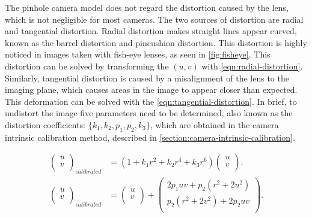 The pinhole camera model does not regard the distortion caused by the lens, which is not negligible for most cameras. The two sources of distortion are radial and tangential distortion. Radial distortion makes straight lines appear curved, known as the barrel distortion and pincushion distortion. This distortion is highly noticed in images taken with fish-eye lenses, as seen in \cref{fig:fisheye}. This distortion can be solved by transforming the $(u, v)$ with \cref{eqn:radial-distortion}. Similarly, tangential distortion is caused by a misalignment of the lens to the imaging plane, which causes areas in the image to appear closer than expected. This deformation can be solved with the \cref{eqn:tangential-distortion}. In brief, to undistort the image five parameters need to be determined, also known as the distortion coefficients: $\{k_1, k_2, p_1, p_2, k_3\}$, which are obtained in the camera intrinsic calibration method, described in \cref{section:camera-intrinsic-calibration}.

\begin{align}
    \label{eqn:radial-distortion}
    \left(
        \begin{array}{c}
            u \\ v \\
        \end{array}
    \right)_{calibrated}
    & =
    (1 + k_1 r^2 + k_2 r^4 + k_3 r^6)
    \left(
        \begin{array}{c}
            u \\ v \\
        \end{array}
    \right).
    \\
    \label{eqn:tangential-distortion}
    \left(
        \begin{array}{c}
            u \\ v \\
        \end{array}
    \right)_{calibrated}
    & =
    \left(
        \begin{array}{c}
            u \\ v \\
        \end{array}
    \right)
    + 
    \left(
        \begin{array}{c}
            2 p_1 u v + p_2 (r^2 + 2u^2) \\
            p_2 (r^2 + 2v^2) + 2 p_2 u v \\
        \end{array}
    \right).
\end{align}

